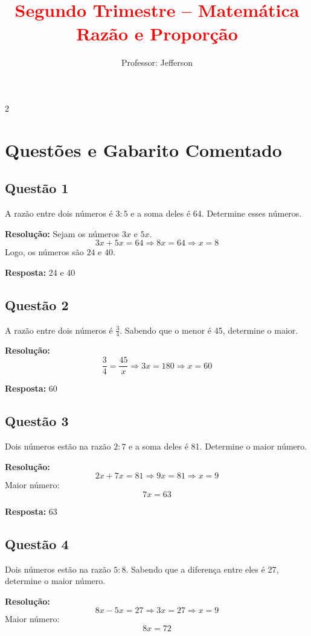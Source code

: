 \documentclass[11pt]{article}
\title{\textcolor{red}{Segundo Trimestre – Matemática\\Razão e Proporção}}
\author{Professor: Jefferson}
\date{}
\begin{document}
\maketitle

\begin{multicols}{2}

\section*{Questões e Gabarito Comentado}

\subsection*{Questão 1}
A razão entre dois números é $3:5$ e a soma deles é 64. Determine esses números.

\textbf{Resolução:}
Sejam os números $3x$ e $5x$.
\[
3x + 5x = 64 \Rightarrow 8x = 64 \Rightarrow x = 8
\]
Logo, os números são $24$ e $40$.

\textbf{Resposta:} 24 e 40

\subsection*{Questão 2}
A razão entre dois números é $\frac{3}{4}$. Sabendo que o menor é 45, determine o maior.

\textbf{Resolução:}
\[
\frac{3}{4} = \frac{45}{x}
\Rightarrow 3x = 180
\Rightarrow x = 60
\]

\textbf{Resposta:} 60

\subsection*{Questão 3}
Dois números estão na razão $2:7$ e a soma deles é 81. Determine o maior número.

\textbf{Resolução:}
\[
2x + 7x = 81 \Rightarrow 9x = 81 \Rightarrow x = 9
\]
Maior número:
\[
7x = 63
\]

\textbf{Resposta:} 63

\subsection*{Questão 4}
Dois números estão na razão $5:8$. Sabendo que a diferença entre eles é 27, determine o maior número.

\textbf{Resolução:}
\[
8x - 5x = 27 \Rightarrow 3x = 27 \Rightarrow x = 9
\]
Maior número:
\[
8x = 72
\]


\end{multicols}
\end{document}
